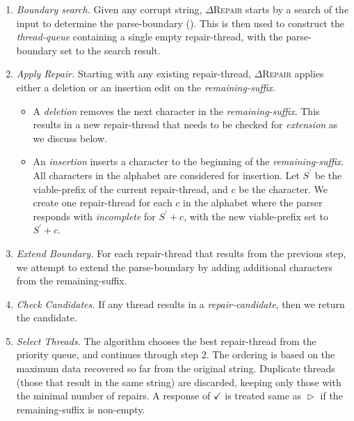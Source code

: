\documentclass[acmsmall,screen,review,anonymous]{acmart}
\def\Rincomplete{\texttt{\color{incompletecolor}\textbf{$\vartriangleright$}}\xspace}
\def\Rvalid{\texttt{\color{validcolor}\textbf{$\checkmark$}}\xspace}
\newcommand{\approach}{\textsc{$\Delta$Repair}\xspace}
\newcommand{\drepair}{\approach}
\begin{document}
\begin{enumerate}
\item \emph{Boundary search.} Given any corrupt string, \drepair starts by a
  search of the input to determine the parse-boundary ().
This is then used to construct the \emph{thread-queue} containing a single empty repair-thread,
with the parse-boundary set to the search result.

\item \emph{Apply Repair.} Starting with any existing repair-thread, \drepair applies
either a deletion or an insertion edit on the \emph{remaining-suffix}.
\begin{itemize}
\item A \emph{deletion} removes the next character in the \emph{remaining-suffix}.
This results in a new repair-thread that needs to be checked for \emph{extension} as we discuss below.
\item An \emph{insertion} inserts a character to the beginning of the \emph{remaining-suffix}.
All characters in the alphabet are considered for insertion.
Let $S^{'}$ be the viable-prefix of the current repair-thread, and $c$ be the character.
We create one repair-thread for each $c$ in the alphabet where the parser
responds with \emph{incomplete} for $S^{'}+c$, with the new viable-prefix set to $S^{'}+c$.
\end{itemize}
\item \emph{Extend Boundary.} For each repair-thread that results from the previous step,
we attempt to extend the parse-boundary by adding additional characters from the
remaining-suffix.
\item \emph{Check Candidates.} If any thread results in a
\emph{repair-candidate}, then we return the candidate.
\item \emph{Select Threads.} The algorithm chooses the best repair-thread from the priority queue,
and continues through step 2. The ordering is based on the maximum data recovered so far from the original string.
Duplicate threads (those that result in the same string) are discarded,
keeping only those with the minimal number of repairs. A response of \Rvalid is
treated same as \Rincomplete if the remaining-suffix is non-empty.
\end{enumerate}
\end{document}
